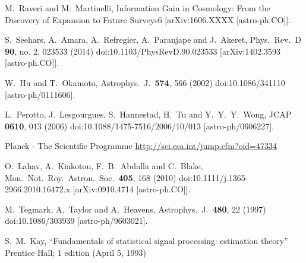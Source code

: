 \documentclass[prd,nofootinbib,showpacs]{revtex4}
\begin{document}
\begin{thebibliography}{99}
  M.~Raveri and M.~Martinelli,
  Information Gain in Cosmology: From the Discovery of Expansion to Future Surveys6
  [arXiv:1606.XXXX [astro-ph.CO]].

  S.~Seehars, A.~Amara, A.~Refregier, A.~Paranjape and J.~Akeret,
  Phys.\ Rev.\ D {\bf 90}, no. 2, 023533 (2014)
  doi:10.1103/PhysRevD.90.023533
  [arXiv:1402.3593 [astro-ph.CO]].

  W.~Hu and T.~Okamoto,
  Astrophys.\ J.\  {\bf 574}, 566 (2002)
  doi:10.1086/341110
  [astro-ph/0111606].
  
  L.~Perotto, J.~Lesgourgues, S.~Hannestad, H.~Tu and Y.~Y.~Y.~Wong,
  JCAP {\bf 0610}, 013 (2006)
  doi:10.1088/1475-7516/2006/10/013
  [astro-ph/0606227].
  
Planck - The Scientific Programme
\href{http://sci.esa.int/jump.cfm?oid=47334}{http://sci.esa.int/jump.cfm?oid=47334}  
  
  O.~Lahav, A.~Kiakotou, F.~B.~Abdalla and C.~Blake,
  Mon.\ Not.\ Roy.\ Astron.\ Soc.\  {\bf 405}, 168 (2010)
  doi:10.1111/j.1365-2966.2010.16472.x
  [arXiv:0910.4714 [astro-ph.CO]].
  
  M.~Tegmark, A.~Taylor and A.~Heavens,
  Astrophys.\ J.\  {\bf 480}, 22 (1997)
  doi:10.1086/303939
  [astro-ph/9603021].
  
  S.~M.~Kay,
  ``Fundamentals of statistical signal processing: estimation theory''
  Prentice Hall; 1 edition (April 5, 1993)
  
\end{thebibliography}

\end{document}
